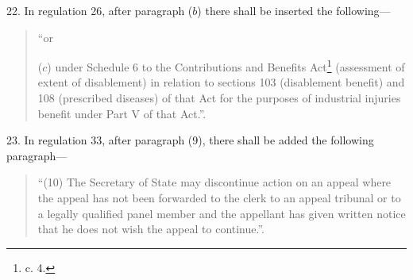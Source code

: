 \documentclass[12pt,a4paper]{article}
\begin{document}
22.  In regulation 26, after paragraph ($b$)  there shall be inserted the following—
\begin{quotation}
“or

($c$) under Schedule 6 to the Contributions and Benefits Act\footnote{ c. 4.} (assessment of extent of disablement) in relation to sections 103 (disablement benefit) and 108 (prescribed diseases) of that Act for the purposes of industrial injuries benefit under Part V of that Act.”.
\end{quotation}

\medskip

23.  In regulation 33, after paragraph (9), there shall be added the following paragraph—
\begin{quotation}
“(10) The Secretary of State may discontinue action on an appeal where the appeal has not been forwarded to the clerk to an appeal tribunal or to a legally qualified panel member and the appellant has given written notice that he does not wish the appeal to continue.”.
\end{quotation}

\medskip
\end{document}
